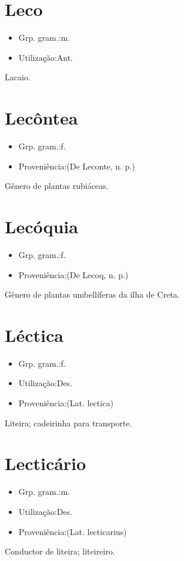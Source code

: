 \section{Leco}
\begin{itemize}
\item {Grp. gram.:m.}
\end{itemize}
\begin{itemize}
\item {Utilização:Ant.}
\end{itemize}
Lacaio.
\section{Lecôntea}
\begin{itemize}
\item {Grp. gram.:f.}
\end{itemize}
\begin{itemize}
\item {Proveniência:(De \textunderscore Leconte\textunderscore , n. p.)}
\end{itemize}
Gênero de plantas rubiáceas.
\section{Lecóquia}
\begin{itemize}
\item {Grp. gram.:f.}
\end{itemize}
\begin{itemize}
\item {Proveniência:(De \textunderscore Lecoq\textunderscore , n. p.)}
\end{itemize}
Gênero de plantas umbellíferas da ilha de Creta.
\section{Léctica}
\begin{itemize}
\item {Grp. gram.:f.}
\end{itemize}
\begin{itemize}
\item {Utilização:Des.}
\end{itemize}
\begin{itemize}
\item {Proveniência:(Lat. \textunderscore lectica\textunderscore )}
\end{itemize}
Liteira; cadeirinha para transporte.
\section{Lecticário}
\begin{itemize}
\item {Grp. gram.:m.}
\end{itemize}
\begin{itemize}
\item {Utilização:Des.}
\end{itemize}
\begin{itemize}
\item {Proveniência:(Lat. \textunderscore lecticarius\textunderscore )}
\end{itemize}
Conductor de liteira; liteireiro.
